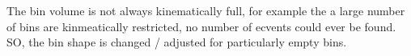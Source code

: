 The bin volume is not always kinematically full, for example the a large number of bins are kinmeatically restricted, no number of ecvents could ever be found. SO, the bin shape is changed / adjusted for particularly empty bins.

